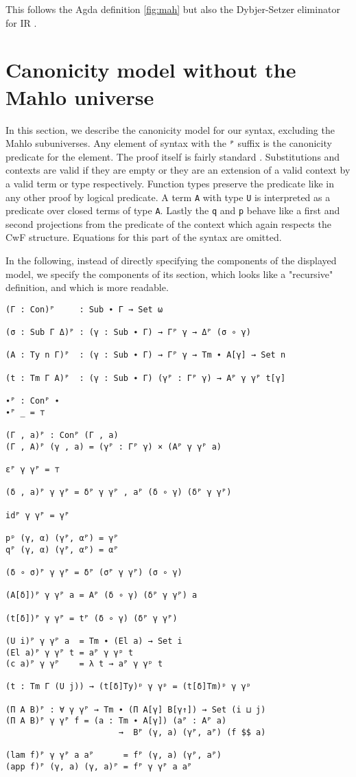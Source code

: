 This follows the Agda definition \ref{fig:mah} but also the Dybjer-Setzer eliminator for IR \cite{dybjer1999finite}.

\section{Canonicity model without the Mahlo universe}

In this section, we describe the canonicity model for our syntax, excluding the Mahlo subuniverses. Any element of syntax with the \texttt{ᴾ} suffix is the canonicity predicate for the element. The proof itself is fairly standard \cite{kaposi2019shallow}. Substitutions and contexts are valid if they are empty or they are an extension of a valid context by a valid term or type respectively. Function types preserve the predicate like in any other proof by logical predicate. A term \texttt{A} with type \texttt{U} is interpreted as a predicate over closed terms of type \texttt{A}. Lastly the \texttt{q} and \texttt{p} behave like a first and second projections from the predicate of the context which again respects the CwF structure. Equations for this part of the syntax are omitted.

In the following, instead of directly specifying the components of the displayed model, we specify the components of its section, which looks like a "recursive" definition, and which is more readable.

\begin{verbatim}
(Γ : Con)ᴾ     : Sub ∙ Γ → Set ω

(σ : Sub Γ Δ)ᴾ : (γ : Sub ∙ Γ) → Γᴾ γ → Δᴾ (σ ∘ γ)

(A : Ty n Γ)ᴾ  : (γ : Sub ∙ Γ) → Γᴾ γ → Tm ∙ A[γ] → Set n

(t : Tm Γ A)ᴾ  : (γ : Sub ∙ Γ) (γᴾ : Γᴾ γ) → Aᴾ γ γᴾ t[γ]

∙ᴾ : Conᴾ ∙
∙ᴾ _ = ⊤

(Γ , a)ᴾ : Conᴾ (Γ , a)
(Γ , A)ᴾ (γ , a) = (γᴾ : Γᴾ γ) × (Aᴾ γ γᴾ a)

εᴾ γ γᴾ = ⊤

(δ , a)ᴾ γ γᴾ = δᴾ γ γᴾ , aᴾ (δ ∘ γ) (δᴾ γ γᴾ)

idᴾ γ γᴾ = γᴾ

pᵖ (γ, α) (γᴾ, αᴾ) = γᴾ
qᴾ (γ, α) (γᴾ, αᴾ) = αᴾ

(δ ∘ σ)ᴾ γ γᴾ = δᴾ (σᴾ γ γᴾ) (σ ∘ γ)

(A[δ])ᴾ γ γᴾ a = Aᴾ (δ ∘ γ) (δᴾ γ γᴾ) a

(t[δ])ᴾ γ γᴾ = tᴾ (δ ∘ γ) (δᴾ γ γᴾ)

(U i)ᴾ γ γᴾ a  = Tm ∙ (El a) → Set i
(El a)ᴾ γ γᴾ t = aᴾ γ γᵖ t
(c a)ᴾ γ γᴾ    = λ t → aᴾ γ γᵖ t

(t : Tm Γ (U j)) → (t[δ]Ty)ᵖ γ γᵖ = (t[δ]Tm)ᵖ γ γᵖ

(Π A B)ᴾ : ∀ γ γᴾ → Tm ∙ (Π A[γ] B[γ↑]) → Set (i ⊔ j)
(Π A B)ᴾ γ γᴾ f = (a : Tm ∙ A[γ]) (aᴾ : Aᴾ a)
                       →  Bᴾ (γ, a) (γᴾ, aᴾ) (f $$ a)

(lam f)ᴾ γ γᴾ a aᴾ      = fᴾ (γ, a) (γᴾ, aᴾ)
(app f)ᴾ (γ, a) (γ, a)ᴾ = fᴾ γ γᴾ a aᴾ
\end{verbatim}

